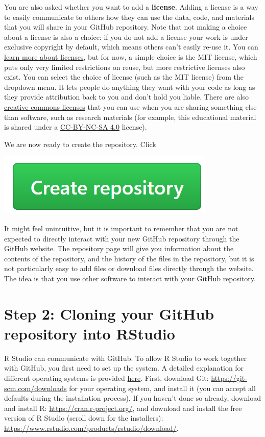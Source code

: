 \documentclass[
  oneside]{book}
\begin{document}
You are also asked whether you want to add a \textbf{license}. Adding a license is a way to easily communicate to others how they can use the data, code, and materials that you will share in your GitHub repository. Note that not making a choice about a license is also a choice: if you do not add a license your work is under exclusive copyright by default, which means others can't easily re-use it. You can \href{https://choosealicense.com/}{learn more about licenses}, but for now, a simple choice is the MIT license, which puts only very limited restrictions on reuse, but more restrictive licenses also exist. You can select the choice of license (such as the MIT license) from the dropdown menu. It lets people do anything they want with your code as long as they provide attribution back to you and don't hold you liable. There are also \href{https://creativecommons.org/choose/}{creative commons
licenses} that you can use when you are sharing something else than software, such as research materials (for example, this educational material is shared under a \href{https://creativecommons.org/licenses/by-nc-sa/4.0}{CC-BY-NC-SA 4.0} license).

We are now ready to create the repository. Click

\begin{center}\includegraphics[width=0.2\linewidth]{images/ccb66558822a17c4a3ec6511c9bf5a7b} \end{center}

It might feel unintuitive, but it is important to remember that you are not
expected to directly interact with your new GitHub repository through the GitHub
website. The repository page will give you information about the contents of the
repository, and the history of the files in the repository, but it is not
particularly easy to add files or download files directly through the website.
The idea is that you use other software to interact with your GitHub repository.

\hypertarget{step-2-cloning-your-github-repository-into-rstudio}{%
\section{Step 2: Cloning your GitHub repository into RStudio}\label{step-2-cloning-your-github-repository-into-rstudio}}

R Studio can communicate with GitHub. To allow R Studio to work together with
GitHub, you first need to set up the system. A detailed explanation for
different operating systems is provided
\href{https://support.rstudio.com/hc/en-us/articles/200532077-Version-Control-with-Git-and-SVN}{here}.
First, download Git: \url{https://git-scm.com/downloads} for your operating system,
and install it (you can accept all defaults during the installation process). If
you haven't done so already, download and install R:
\url{https://cran.r-project.org/}, and download and install the free version of R
Studio (scroll down for the installers):
\url{https://www.rstudio.com/products/rstudio/download/}.
\end{document}
